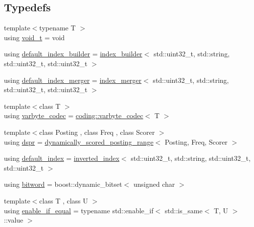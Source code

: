 \subsection*{Typedefs}
\begin{DoxyCompactItemize}
\item 
{\footnotesize template$<$typename T $>$ }\\using \mbox{\hyperlink{namespaceirk_a8b44ecf42d719b2badcf5e7c86899918}{void\+\_\+t}} = void
\item 
using \mbox{\hyperlink{namespaceirk_af1d86af53878a68d661f3e8ea2dc06b9}{default\+\_\+index\+\_\+builder}} = \mbox{\hyperlink{classirk_1_1index__builder}{index\+\_\+builder}}$<$ std\+::uint32\+\_\+t, std\+::string, std\+::uint32\+\_\+t, std\+::uint32\+\_\+t $>$
\item 
using \mbox{\hyperlink{namespaceirk_a1a0dd571a3774e966f9d89abe5d4c6ee}{default\+\_\+index\+\_\+merger}} = \mbox{\hyperlink{classirk_1_1index__merger}{index\+\_\+merger}}$<$ std\+::uint32\+\_\+t, std\+::string, std\+::uint32\+\_\+t, std\+::uint32\+\_\+t $>$
\item 
{\footnotesize template$<$class T $>$ }\\using \mbox{\hyperlink{namespaceirk_a9ce0dc691e62f8bbf0578ea3d778d18d}{varbyte\+\_\+codec}} = \mbox{\hyperlink{structirk_1_1coding_1_1varbyte__codec}{coding\+::varbyte\+\_\+codec}}$<$ T $>$
\item 
{\footnotesize template$<$class Posting , class Freq , class Scorer $>$ }\\using \mbox{\hyperlink{namespaceirk_af92c7aae439f59ccae252f027f851c24}{dspr}} = \mbox{\hyperlink{classirk_1_1dynamically__scored__posting__range}{dynamically\+\_\+scored\+\_\+posting\+\_\+range}}$<$ Posting, Freq, Scorer $>$
\item 
using \mbox{\hyperlink{namespaceirk_af6ee69596c3b148bdec81164443f37f8}{default\+\_\+index}} = \mbox{\hyperlink{classirk_1_1inverted__index}{inverted\+\_\+index}}$<$ std\+::uint32\+\_\+t, std\+::string, std\+::uint32\+\_\+t, std\+::uint32\+\_\+t $>$
\item 
using \mbox{\hyperlink{namespaceirk_a979e09720c2ef05573819388a3c0e79a}{bitword}} = boost\+::dynamic\+\_\+bitset$<$ unsigned char $>$
\item 
{\footnotesize template$<$class T , class U $>$ }\\using \mbox{\hyperlink{namespaceirk_a57b757ac14c20845b38f720c2ad8e822}{enable\+\_\+if\+\_\+equal}} = typename std\+::enable\+\_\+if$<$ std\+::is\+\_\+same$<$ T, U $>$\+::value $>$
\item 

\end{DoxyCompactItemize}
